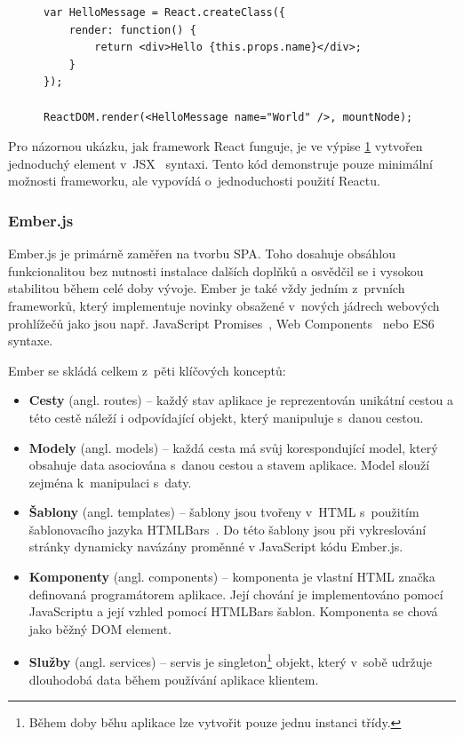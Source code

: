 
\begin{figure}[ht]
\lstset{basicstyle=\small,style=JSON}
\begin{lstlisting}
var HelloMessage = React.createClass({
    render: function() {
        return <div>Hello {this.props.name}</div>;
    }
});

ReactDOM.render(<HelloMessage name="World" />, mountNode);
\end{lstlisting}
\label{code:react}
\end{figure}

Pro názornou ukázku, jak framework React funguje, je ve výpise \ref{code:react} vytvořen jednoduchý  element v~JSX~\cite{jsx} syntaxi. Tento kód demonstruje pouze minimální možnosti frameworku, ale vypovídá o~jednoduchosti použití Reactu.

\subsubsection*{Ember.js}

Ember.js je primárně zaměřen na tvorbu SPA. Toho dosahuje obsáhlou funkcionalitou bez nutnosti instalace dalších doplňků a osvědčil se i vysokou stabilitou během celé doby vývoje. Ember je také vždy jedním z~prvních frameworků, který implementuje novinky obsažené v~nových jádrech webových prohlížečů jako jsou např. JavaScript Promises~\cite{jspromises}, Web Components~\cite{webcomponents} nebo ES6 syntaxe.

Ember se skládá celkem z~pěti klíčových konceptů:

\begin{itemize}  
    \item {\bf Cesty} (angl. routes) -- každý stav aplikace je reprezentován unikátní cestou a této cestě náleží i odpovídající objekt, který manipuluje s~danou cestou.
    \item {\bf Modely} (angl. models) -- každá cesta má svůj korespondující model, který obsahuje data asociována s~danou cestou a stavem aplikace. Model slouží zejména k~manipulaci s~daty.
    \item {\bf Šablony} (angl. templates) -- šablony jsou tvořeny v~HTML s~použitím šablonovacího jazyka HTMLBars~\cite{htmlbars}. Do této šablony jsou při vykreslování stránky dynamicky navázány proměnné v JavaScript kódu Ember.js. 
    \item {\bf Komponenty} (angl. components) -- komponenta je vlastní HTML značka definovaná programátorem aplikace. Její chování je implementováno pomocí JavaScriptu a její vzhled pomocí HTMLBars šablon. Komponenta se chová jako běžný DOM element.
    \item {\bf Služby} (angl. services) -- servis je singleton\footnote{Během doby běhu aplikace lze vytvořit pouze jednu instanci třídy.} objekt, který v~sobě udržuje dlouhodobá data během používání aplikace klientem.
\end{itemize}

